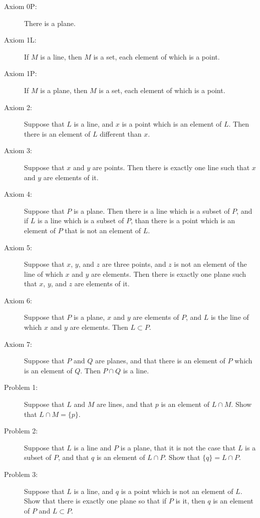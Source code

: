 \documentclass{article}
\begin{document}
\begin{description}
  \item[Axiom 0P:] There is a plane.

  \item[Axiom 1L:] If $M$ is a line, then $M$ is a set, each element of which is a point.

  \item[Axiom 1P:] If $M$ is a plane, then $M$ is a set, each element of which is a point.

  \item[Axiom 2:] Suppose that $L$ is a line, and $x$ is a point which is an element of $L$. Then there is an element of $L$ different than $x$.

  \item[Axiom 3:] Suppose that $x$ and $y$ are points. Then there is exactly one line such that $x$ and $y$ are elements of it.

  \item[Axiom 4:] Suppose that $P$ is a plane. Then there is a line which is a subset of $P$, and if $L$ is a line which is a subset of $P$, than there is a point which is an element of $P$ that is not an element of $L$.

  \item[Axiom 5:] Suppose that $x$, $y$, and $z$ are three points, and $z$ is not an element of the line of which $x$ and $y$ are elements. Then there is exactly one plane such that $x$, $y$, and $z$ are elements of it.

  \item[Axiom 6:] Suppose that $P$ is a plane, $x$ and $y$ are elements of $P$, and $L$ is the line of which $x$ and $y$ are elements. Then $L \subset P$.

  \item[Axiom 7:] Suppose that $P$ and $Q$ are planes, and that there is an element of $P$ which is an element of $Q$. Then $P \cap Q$ is a line.

  \item[Problem 1:] Suppose that $L$ and $M$ are lines, and that $p$ is an element of $L \cap M$. Show that $L \cap M = \{ p \}$.

  \item[Problem 2:] Suppose that $L$ is a line and $P$ is a plane, that it is not the case that $L$ is a subset of $P$, and that $q$ is an element of $L \cap P$. Show that $\{ q \} = L \cap P$.

  \item[Problem 3:] Suppose that $L$ is a line, and $q$ is a point which is not an element of $L$. Show that there is exactly one plane so that if $P$ is it, then $q$ is an element of $P$ and $L \subset P$.


\end{description}
\end{document}
